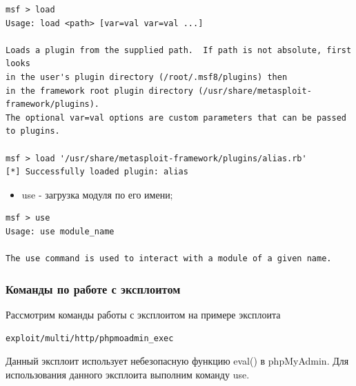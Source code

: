 \documentclass[10pt,a4paper,titlepage]{article}
\begin{document}
\begin{verbatim}
msf > load
Usage: load <path> [var=val var=val ...]

Loads a plugin from the supplied path.  If path is not absolute, first looks
in the user's plugin directory (/root/.msf8/plugins) then
in the framework root plugin directory (/usr/share/metasploit-framework/plugins).
The optional var=val options are custom parameters that can be passed to plugins.

msf > load '/usr/share/metasploit-framework/plugins/alias.rb' 
[*] Successfully loaded plugin: alias
\end{verbatim}
\begin{itemize}
\item use - загрузка модуля по его имени;
\end{itemize}
\begin{verbatim}
msf > use
Usage: use module_name

The use command is used to interact with a module of a given name.
\end{verbatim}
\subsubsection{Команды по работе с эксплоитом}
Рассмотрим команды работы с эксплоитом на примере эксплоита 
\begin{verbatim}
exploit/multi/http/phpmoadmin_exec
\end{verbatim}

Данный эксплоит использует небезопасную функцию eval() в phpMyAdmin. Для использования данного эксплоита выполним команду use.
\end{document}
